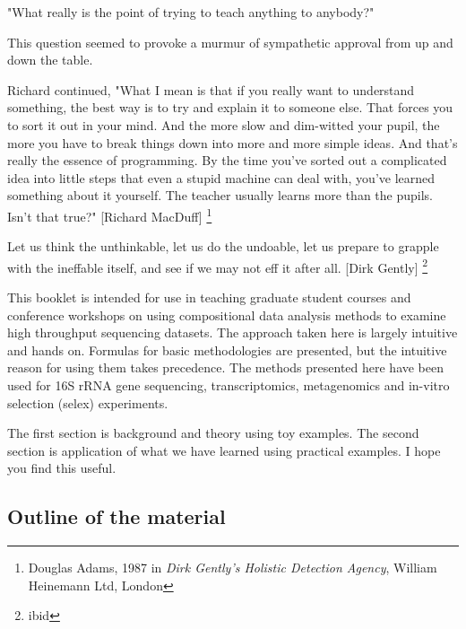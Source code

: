\documentclass[
  onecolumn]{article}
\begin{document}
\hspace{2cm}\begin{minipage}[ct]{10cm}
\parskip=5pt
\parindent=5pt

"What really is the point of trying to teach anything to anybody?"

This question seemed to provoke a murmur of sympathetic approval from up and down the table.

 Richard continued, "What I mean is that if you really want to understand something, the best way is to try and explain it to someone else. That forces you to sort it out in your mind. And the more slow and dim-witted your pupil, the more you have to break things down into more and more simple ideas. And that's really the essence of programming. By the time you've sorted out a complicated idea into little steps that even a stupid machine can deal with, you've learned something about it yourself. The teacher usually learns more than the pupils. Isn't that true?" [Richard MacDuff] \footnote{Douglas Adams, 1987 in \emph{Dirk Gently's Holistic Detection Agency},  William Heinemann Ltd, London}

 \vspace{1cm}
 Let us think the unthinkable, let us do the undoable, let us prepare to grapple with the ineffable itself, and see if we may not eff it after all. [Dirk Gently] \footnote{ibid}

\end{minipage}

This booklet is intended for use in teaching graduate student courses and conference workshops on using compositional data analysis methods to examine high throughput sequencing datasets. The approach taken here is largely intuitive and hands on. Formulas for basic methodologies are presented, but the intuitive reason for using them takes precedence. The methods presented here have been used for 16S rRNA gene sequencing, transcriptomics, metagenomics and in-vitro selection (selex) experiments.

The first section is background and theory using toy examples. The second section is application of what we have learned using practical examples. I hope you find this useful.

\hypertarget{outline-of-the-material}{%
\subsection{Outline of the material}\label{outline-of-the-material}}
\end{document}
